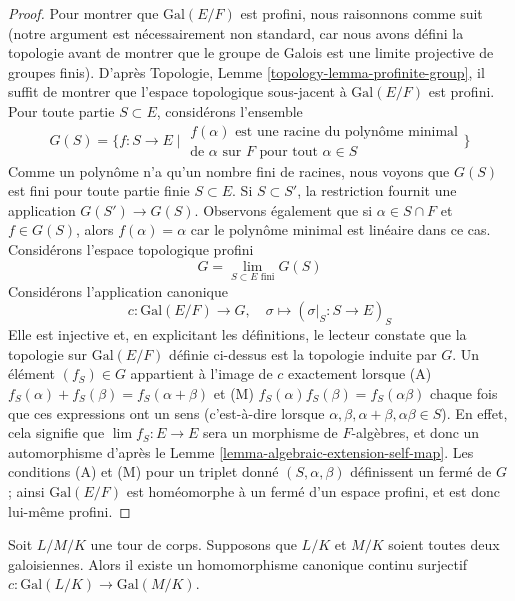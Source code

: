 \begin{proof}
\medskip\noindent
Pour montrer que $\text{Gal}(E/F)$ est profini, nous raisonnons comme suit
(notre argument est nécessairement non standard, car nous avons défini
la topologie avant de montrer que le groupe de Galois est une limite
projective de groupes finis).
D'après Topologie, Lemme \ref{topology-lemma-profinite-group},
il suffit de montrer que l'espace topologique
sous-jacent à $\text{Gal}(E/F)$ est profini.
Pour toute partie $S \subset E$, considérons l'ensemble
$$
G(S) = \{ f : S \to E \mid
\begin{matrix}
f(\alpha)\text{ est une racine du polynôme minimal}\\
\text{de }\alpha\text{ sur }F\text{ pour tout }\alpha \in S
\end{matrix}
\}
$$
Comme un polynôme n'a qu'un nombre fini de racines, nous voyons que
$G(S)$ est fini pour toute partie finie $S \subset E$. Si $S \subset S'$,
la restriction fournit une application $G(S') \to G(S)$. Observons également
que si $\alpha \in S \cap F$ et $f \in G(S)$, alors $f(\alpha) = \alpha$
car le polynôme minimal est linéaire dans ce cas.
Considérons l'espace topologique profini
$$
G = \lim_{S \subset E\text{ fini}} G(S)
$$
Considérons l'application canonique
$$
c : \text{Gal}(E/F) \longrightarrow G,\quad
\sigma \longmapsto (\sigma|_S : S \to E)_S
$$
Elle est injective et, en explicitant les définitions, le lecteur constate
que la topologie sur $\text{Gal}(E/F)$ définie ci-dessus
est la topologie induite par $G$. Un élément $(f_S) \in G$ appartient à
l'image de $c$ exactement lorsque
(A) $f_S(\alpha) + f_S(\beta) = f_S(\alpha + \beta)$ et
(M) $f_S(\alpha)f_S(\beta) = f_S(\alpha\beta)$ chaque fois que
ces expressions ont un sens (c'est-à-dire lorsque
$\alpha, \beta, \alpha + \beta, \alpha\beta \in S$).
En effet, cela signifie que
$\lim f_S : E \to E$ sera un morphisme de $F$-algèbres,
et donc un automorphisme d'après le
Lemme \ref{lemma-algebraic-extension-self-map}.
Les conditions (A) et (M) pour un triplet donné
$(S, \alpha, \beta)$ définissent un fermé de
$G$ ; ainsi $\text{Gal}(E/F)$ est homéomorphe
à un fermé d'un espace profini, et est donc lui-même profini.
\end{proof}

\begin{lemma}
\label{lemma-galois-infinite}
Soit $L/M/K$ une tour de corps. Supposons que $L/K$ et
$M/K$ soient toutes deux galoisiennes. Alors il existe un homomorphisme canonique
continu surjectif $c : \text{Gal}(L/K) \to \text{Gal}(M/K)$.
\end{lemma}

